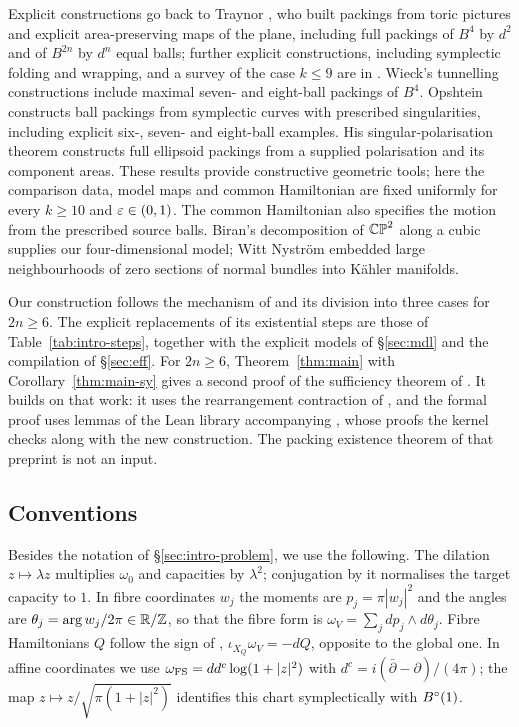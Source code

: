 Explicit constructions go back to Traynor \cite{Traynor1995}, who built packings from toric pictures and
explicit area-preserving maps of the plane, including full packings of $B^4$ by $d^2$ and of $B^{2n}$ by $d^n$
equal balls; further explicit constructions, including symplectic folding and wrapping, and a survey of
the case $k\le9$ are in \cite{SchlenkHand,SchlenkBook,Schlenk2018}. Wieck's tunnelling constructions
\cite{Wieck2009} include maximal seven- and eight-ball packings of $B^4$.
Opshtein \cite[Theorem 4(ii), \S5.4]{Opshtein2011} constructs ball packings from symplectic curves with prescribed
singularities, including explicit six-, seven- and eight-ball examples. His singular-polarisation theorem
\cite[Theorem 3]{Opshtein2013} constructs full ellipsoid packings from a supplied polarisation and its component areas.
These results provide constructive geometric tools; here the comparison data, model maps and common Hamiltonian
are fixed uniformly for every $k\ge10$ and $\varepsilon\in(0,1)$. The common Hamiltonian also specifies the motion from the prescribed source balls.
Biran's decomposition of $\mathbb{CP}^2$ along a cubic \cite{Biran2001} supplies our four-dimensional model;
Witt Nyström \cite{WittNystrom2024} embedded large neighbourhoods of zero sections of normal bundles into Kähler manifolds.

Our construction follows the mechanism of \cite{OpenAI2026} and its division into three cases for
$2n\ge6$. The explicit replacements of its existential steps are those of Table~\ref{tab:intro-steps}, together with
the explicit models of \S\ref{sec:mdl} and the compilation of \S\ref{sec:eff}. For $2n\ge6$, Theorem~\ref{thm:main}
with Corollary~\ref{thm:main-sy} gives a second proof of the sufficiency theorem of \cite{OpenAI2026}. It builds on
that work: it uses the rearrangement contraction of \cite[\S2]{OpenAI2026}, and the formal proof uses lemmas of the
Lean library accompanying \cite{OpenAI2026}, whose proofs the kernel checks along with the new construction. The
packing existence theorem of that preprint is not an input.

\subsection{Conventions}\label{sec:intro-conventions}

Besides the notation of \S\ref{sec:intro-problem}, we use the following. The dilation $z\mapsto\lambda z$
multiplies $\omega_0$ and capacities by $\lambda^2$; conjugation by it normalises the target capacity
to $1$. In fibre coordinates $w_j$ the moments are $p_j=\pi|w_j|^2$ and the angles are
$\theta_j=\arg w_j/2\pi\in\mathbb{R}/\mathbb{Z}$, so that the fibre form is $\omega_V=\sum_jdp_j\wedge d\theta_j$. Fibre
Hamiltonians $Q$ follow the sign of \cite{OpenAI2026}, $\iota_{X_Q}\omega_V=-dQ$, opposite to the global
one. In affine coordinates we use $\omega_{\rm FS}=dd^c\log(1+|z|^2)$ with
$d^c=i(\bar\partial-\partial)/(4\pi)$; the map
$z\mapsto z/\sqrt{\pi(1+|z|^2)}$ identifies this chart symplectically with $B^{\circ}(1)$.

